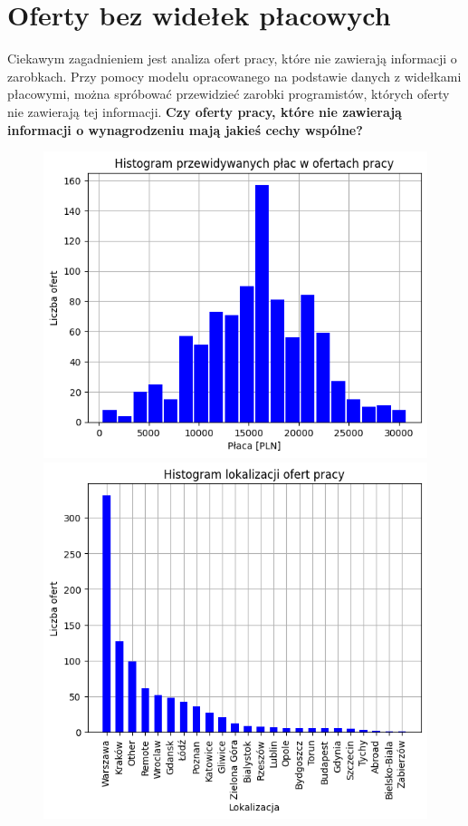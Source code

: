 \documentclass{article}
\begin{document}
\section{Oferty bez widełek płacowych}

Ciekawym zagadnieniem jest analiza ofert pracy, które nie zawierają informacji o zarobkach.
Przy pomocy modelu opracowanego na podstawie danych z widełkami płacowymi, można spróbować
przewidzieć zarobki programistów, których oferty nie zawierają tej informacji.
\textbf{Czy oferty pracy, które nie zawierają informacji o wynagrodzeniu mają jakieś cechy wspólne?}

\begin{figure}[h]
    \centering
    \begin{minipage}{0.45\textwidth}
        \centering
        \includegraphics[width=\textwidth]{img/zero_salary_hist.png}
    \end{minipage}
    \hfill
    \begin{minipage}{0.45\textwidth}
        \centering
        \includegraphics[width=\textwidth]{img/zero_location_hist.png}
    \end{minipage}
\end{figure}
\end{document}
